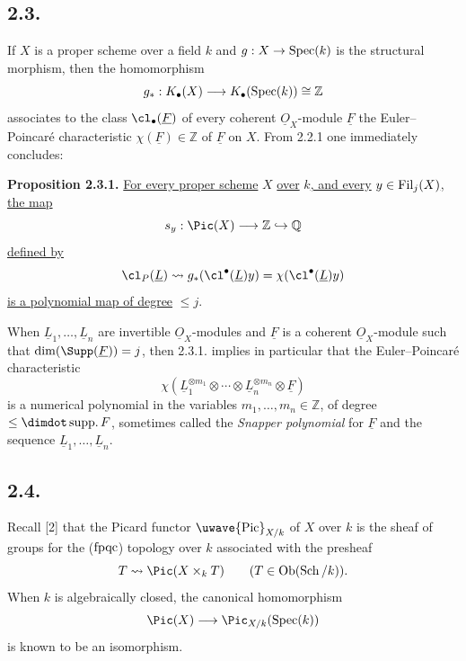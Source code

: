 \subsection*{2.3.}
If $X$ is a proper scheme over a field $k$ and $g:X\to\operatorname{Spec}(k)$ is the structural morphism, then the homomorphism
\[
g_*:K_\bullet(X)\longrightarrow K_\bullet(\operatorname{Spec}(k))\cong\mathbb Z
\]
associates to the class $\cl_\bullet(\underline{F})$ of every coherent $\underline{O}_X$-module $\underline{F}$ the Euler--Poincaré characteristic $\chi(\underline{F})\in\mathbb Z$ of $\underline{F}$ on $X$. From 2.2.1 one immediately concludes:


%

\textbf{Proposition 2.3.1.} \uline{For every proper scheme} $X$ \uline{over} $k$\uline{, and every} $y\in\operatorname{Fil}_j(X)$\uline{, the map}
\[
s_y:\Pic(X)\longrightarrow\mathbb Z\hookrightarrow\mathbb Q
\]
\uline{defined by}
\[
\cl_P(\underline{L})\rightsquigarrow g_*(\cl^{\bullet}(\underline{L})y)=\chi(\cl^{\bullet}(\underline{L})y)
\]
\uline{is a polynomial map of degree} $\leq j$.

When $\underline{L}_1,\ldots,\underline{L}_n$ are invertible $\underline{O}_X$-modules and $\underline{F}$ is a coherent $\underline{O}_X$-module such that $\dim(\Supp(\underline{F}))=j$, then 2.3.1. implies in particular that the Euler--Poincaré characteristic
\begin{equation}\tag{2.3.2}
\chi(\underline{L}_1^{\otimes m_1}\otimes\cdots\otimes \underline{L}_n^{\otimes m_n}\otimes \underline{F})
\end{equation}
is a numerical polynomial in the variables $m_1,\ldots,m_n\in\mathbb Z$, of degree $\leq\dimdot\operatorname{supp.}F$, sometimes called the \emph{Snapper polynomial} for $\underline{F}$ and the sequence $\underline{L}_1,\ldots,\underline{L}_n$.

\subsection*{2.4.}
Recall [2] that the Picard functor $\text{\uwave{Pic}}_{X/k}$ of $X$ over $k$ is the sheaf of groups for the ($\mathrm{fpqc}$) topology over $k$ associated with the presheaf
\[
T\rightsquigarrow \Pic(X\times_kT)\qquad (T\in\operatorname{Ob}(\Sch/k)).
\]
When $k$ is algebraically closed, the canonical homomorphism
\[
\Pic(X)\longrightarrow\Pic_{X/k}(\Spec(k))
\]
is known to be an isomorphism.

